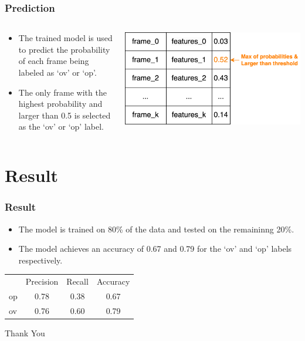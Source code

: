 \documentclass{beamer}
\begin{document}
\begin{frame}[allowframebreaks]
\frametitle{Prediction}
  \begin{columns}[T] %
    \begin{column}{.5\textwidth}
      \begin{itemize}
        \item The trained model is used to predict the probability of each frame being labeled as `ov' or `op'.
        \item The only frame with the highest probability and larger than 0.5 is selected as the `ov' or `op' label.
      \end{itemize}
    \end{column}%
    \begin{column}{.5\textwidth}
      \begin{block}{}
      \includegraphics[width=\textwidth,height=\textheight,keepaspectratio]{img/prediction.png}
      \end{block}
    \end{column}%
  \end{columns}
\end{frame}

\section{Result}
\begin{frame}[allowframebreaks]
\frametitle{Result}\scriptsize
  \begin{itemize}
    \item The model is trained on 80\% of the data and tested on the remaininng 20\%.
    \item The model achieves an accuracy of 0.67 and 0.79 for the `ov' and `op' labels respectively.
  \end{itemize}

  \begin{table}[h]
    \centering
    \begin{tabular}{l c c c}
    \midrule
    & Precision & Recall & Accuracy \\
    op & 0.78 & 0.38 & 0.67 \\
    ov & 0.76 & 0.60 & 0.79 \\
    \midrule
    \end{tabular}
  \end{table}
\end{frame}

\begin{frame}
\Huge{\centerline{Thank You}}
\end{frame}
\end{document}

